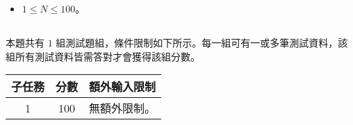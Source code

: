 


\section*{}
\subsection*{}

\subsection*{}

\subsection*{}

\subsection*{}
\begin{itemize}
    \item $1\le N\le 100$。
\end{itemize}
\subsection*{}
{
\setlength\parindent{0pt}
\td{

}
}
\subsection*{}
{
\setlength\parindent{0pt}
\td{

}
}
\subsection*{}
{
\setlength\parindent{0pt}
\td{

}
}
\subsection*{}
{
\setlength\parindent{0pt}
\td{

}
}
\subsection*{}
本題共有 $1$ 組測試題組，條件限制如下所示。每一組可有一或多筆測試資料，該組所有測試資料皆需答對才會獲得該組分數。
\begin{center}
    \begin{tabular}[t]{@{}ccl@{}}
    \toprule
    子任務 & 分數 & 額外輸入限制\\
    \midrule
    1 & 100 & 無額外限制。\\
    \bottomrule
    \end{tabular}
\end{center}


